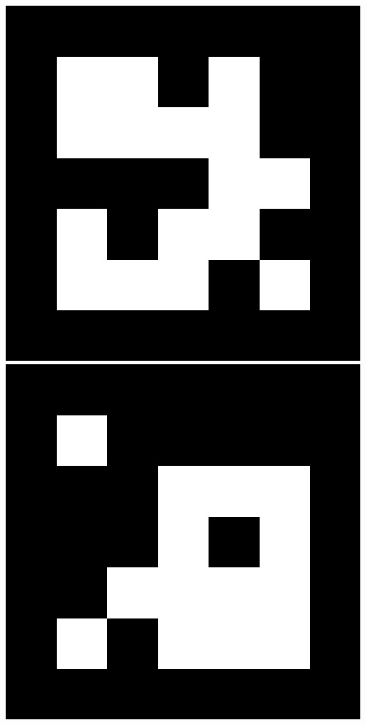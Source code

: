 \documentclass[main.tex]{subfiles}
\begin{document}
\includegraphics[scale=.2]{images/aruco3.jpg}
\includegraphics[scale=.2]{images/aruco4.jpg}
\end{document}
